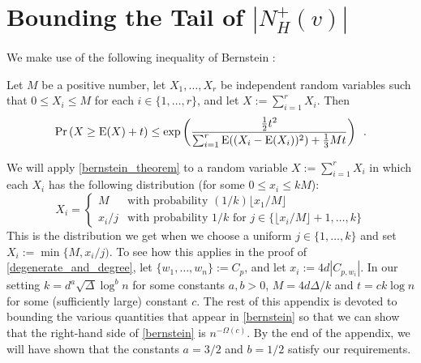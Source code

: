 \documentclass{patmorin}
\begin{document}




\appendix

\section{Bounding the Tail of \boldmath$|N_H^+(v)|$}

We make use of the following inequality of Bernstein \cite[Corollary~2.11]{boucheron.lugosi.ea:concentration}:

\begin{thm}\label{bernstein_theorem}
  Let $M$ be a positive number, let $X_1,\ldots,X_r$ be independent random variables such that $0\le X_i\le M$ for each $i\in\{1,\ldots,r\}$, and let $X:=\sum_{i=1}^r X_i$. Then
  \begin{equation}
    \Pr\left(X \ge \mathrm{E}(X)+ t\right)
      \le \exp\left(\frac{\tfrac{1}{2}t^2}{\sum_{i=1}^r \mathrm{E}((X_i-\mathrm{E}(X_i))^2)+\tfrac{1}{3}Mt}\right) \enspace . \label{bernstein}
  \end{equation}
\end{thm}
We will apply \cref{bernstein_theorem} to a random variable $X:=\sum_{i=1}^r X_i$ in which each $X_i$ has the following distribution (for some $0\le x_i\le kM$):
\[
  X_i = \begin{cases}
          M & \text{with probability $(1/k)\lfloor x_1/M\rfloor$} \\
          x_i/j & \text{with probability $1/k$ for $j\in\{\lfloor x_i/M\rfloor+1,\ldots,k\}$}
        \end{cases}
\]
This is the distribution we get when we choose a uniform $j\in\{1,\ldots,k\}$ and set $X_i:=\min\{M,x_i/j)$.  To see how this applies in the proof of \cref{degenerate_and_degree}, let $\{w_1,\ldots,w_n\}:=C_p$, and let $x_i:=4d|C_{p,w_i}|$.  In our setting $k=d^a\sqrt{\Delta}\log^b n$ for some constants $a,b>0$, $M=4d\Delta/k$ and $t=ck\log n$ for some (sufficiently large) constant $c$.  The rest of this appendix is devoted to bounding the various quantities that appear in \cref{bernstein} so that we can show that the right-hand side of \cref{bernstein} is $n^{-\Omega(c)}$.    By the end of the appendix, we will have shown that the constants $a=3/2$ and $b=1/2$ satisfy our requirements.
\end{document}

